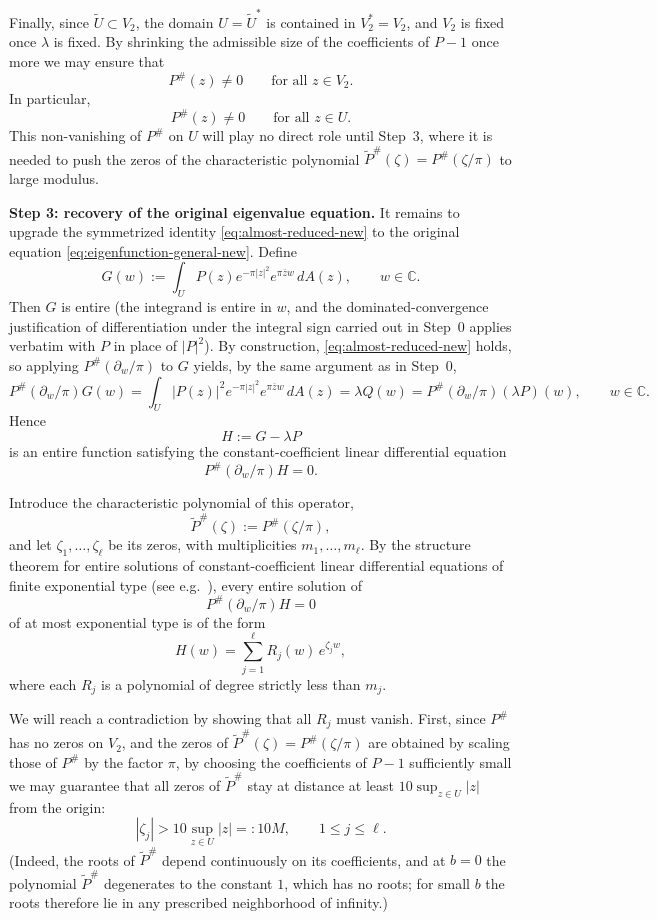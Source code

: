 \documentclass[a4paper,11pt,reqno]{amsart}
\numberwithin{equation}{section}
\theoremstyle{plain} %
\theoremstyle{definition} %
\theoremstyle{remark}
\newcommand{\C}{\mathbb{C}}
\begin{document}
Finally, since \(\widetilde U\subset V_2\), the domain \(U=\widetilde U^\ast\) is contained in \(V_2^\ast=V_2\), and \(V_2\) is fixed once \(\lambda\) is fixed. By shrinking the admissible size of the coefficients of \(P-1\) once more we may ensure that
\[
P^\#(z)\neq 0
\qquad \text{for all } z\in V_2.
\]
In particular,
\[
P^\#(z)\neq 0
\qquad \text{for all } z\in U.
\]
This non-vanishing of $P^\#$ on $U$ will play no direct role until Step~3, where it is needed to push the zeros of the characteristic polynomial $\widetilde P^\#(\zeta)=P^\#(\zeta/\pi)$ to large modulus.

\medskip
\noindent\textbf{Step 3: recovery of the original eigenvalue equation.}
It remains to upgrade the symmetrized identity \eqref{eq:almost-reduced-new} to the original equation \eqref{eq:eigenfunction-general-new}. Define
\[
G(w):=\int_U P(z)e^{-\pi|z|^2}e^{\pi \overline z w}\,dA(z),
\qquad w\in\C.
\]
Then $G$ is entire (the integrand is entire in $w$, and the dominated-convergence justification of differentiation under the integral sign carried out in Step~0 applies verbatim with $P$ in place of $|P|^2$). By construction, \eqref{eq:almost-reduced-new} holds, so applying $P^\#(\partial_w/\pi)$ to $G$ yields, by the same argument as in Step~0,
\[
P^\#(\partial_w/\pi)G(w)=\int_U|P(z)|^2 e^{-\pi|z|^2}e^{\pi\overline z w}\,dA(z)=\lambda Q(w)=P^\#(\partial_w/\pi)(\lambda P)(w),
\qquad w\in \C.
\]
Hence
\[
H:=G-\lambda P
\]
is an entire function satisfying the constant-coefficient linear differential equation
\[
P^\#(\partial_w/\pi)H=0.
\]

Introduce the characteristic polynomial of this operator,
\[
\widetilde P^\#(\zeta):=P^\#(\zeta/\pi),
\]
and let $\zeta_1,\dots,\zeta_\ell$ be its zeros, with multiplicities $m_1,\dots,m_\ell$. By the structure theorem for entire solutions of constant-coefficient linear differential equations of finite exponential type (see e.g.\ \cite[Ch.\ XII]{Hormander}), every entire solution of
\[
P^\#(\partial_w/\pi)H=0
\]
of at most exponential type is of the form
\begin{equation}\label{eq:exp-decomposition-step3}
H(w)=\sum_{j=1}^\ell R_j(w)\,e^{\zeta_j w},
\end{equation}
where each $R_j$ is a polynomial of degree strictly less than $m_j$.

We will reach a contradiction by showing that all $R_j$ must vanish. First, since $P^\#$ has no zeros on $V_2$, and the zeros of $\widetilde P^\#(\zeta)=P^\#(\zeta/\pi)$ are obtained by scaling those of $P^\#$ by the factor $\pi$, by choosing the coefficients of $P-1$ sufficiently small we may guarantee that all zeros of $\widetilde P^\#$ stay at distance at least $10\sup_{z\in U}|z|$ from the origin:
\[
|\zeta_j|>10\sup_{z\in U}|z|=:10M,
\qquad 1\le j\le \ell.
\]
(Indeed, the roots of $\widetilde P^\#$ depend continuously on its coefficients, and at $b=0$ the polynomial $\widetilde P^\#$ degenerates to the constant $1$, which has no roots; for small $b$ the roots therefore lie in any prescribed neighborhood of infinity.)
\end{document}
